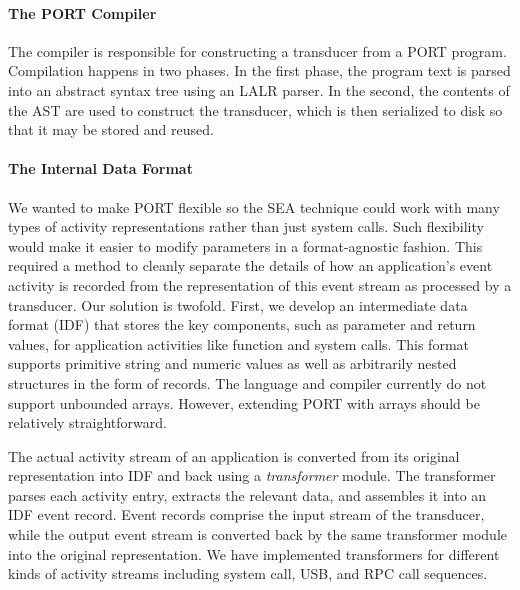 \paragraph{The PORT Compiler}
The compiler is responsible for constructing a transducer
from a PORT program.
Compilation happens in two phases.  In the first phase, the program text is
parsed into an abstract syntax tree using an LALR parser.
In the second, the
contents of the AST are used to construct the transducer, which is then serialized to
disk so that it may be stored and reused.

\paragraph{The Internal Data Format}
 We wanted to make PORT flexible so the SEA technique
could
work with many types of
activity representations rather than just system calls.
Such flexibility would make it easier to modify parameters in a format-agnostic fashion.
This required a method to cleanly separate the details of how
an application's event activity is recorded from the representation of this event stream as
processed by a transducer.
Our solution is twofold.  First, we develop an intermediate data format
(IDF) that
stores the key components, such as parameter and return values,
for application activities like function
and system calls.  This format supports primitive string and numeric
values as well as arbitrarily nested structures in the form of records.
The language and compiler currently do not support unbounded arrays. However, extending PORT with arrays should be relatively straightforward.


The actual activity stream of an application is converted from its original representation into IDF and
back using a \emph{transformer} module. The transformer parses each activity entry,
extracts the relevant data, and assembles it into an IDF
event record.  Event records comprise the input stream of the transducer, while
the output event stream is converted back by the same transformer module
into the original  representation. We have implemented transformers for different kinds of activity streams including system call, USB, and RPC call sequences.

